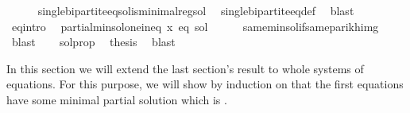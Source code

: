 \begin{isabellebody}
\ \ \ \ \isamarkupfalse%
\ single{\isacharunderscore}{\kern0pt}bipartite{\isacharunderscore}{\kern0pt}eq{\isachardot}{\kern0pt}sol{\isacharunderscore}{\kern0pt}is{\isacharunderscore}{\kern0pt}minimal{\isacharunderscore}{\kern0pt}reg{\isacharunderscore}{\kern0pt}sol\ \isamarkupfalse%
\ single{\isacharunderscore}{\kern0pt}bipartite{\isacharunderscore}{\kern0pt}eq{\isacharunderscore}{\kern0pt}def\ \isamarkupfalse%
\ blast\isanewline
\ \ \isamarkupfalse%
\ eq{\isacharprime}{\kern0pt}{\isacharunderscore}{\kern0pt}intro\ \isamarkupfalse%
\ {\isachardoublequoteopen}partial{\isacharunderscore}{\kern0pt}min{\isacharunderscore}{\kern0pt}sol{\isacharunderscore}{\kern0pt}one{\isacharunderscore}{\kern0pt}ineq\ x\ eq\ {\isacharquery}{\kern0pt}sol{\isachardoublequoteclose}\isanewline
\ \ \ \ \isamarkupfalse%
\ same{\isacharunderscore}{\kern0pt}min{\isacharunderscore}{\kern0pt}sol{\isacharunderscore}{\kern0pt}if{\isacharunderscore}{\kern0pt}same{\isacharunderscore}{\kern0pt}parikh{\isacharunderscore}{\kern0pt}img\ \isamarkupfalse%
\ blast\isanewline
\ \ \isamarkupfalse%
\ sol{\isacharunderscore}{\kern0pt}prop\ \isamarkupfalse%
\ {\isacharquery}{\kern0pt}thesis\ \isamarkupfalse%
\ blast\isanewline
{}\isamarkupfalse%
%
\endisatagproof
{\isafoldproof}%
%
\isadelimproof
%
\endisadelimproof
%
\isadelimdocument
%
\endisadelimdocument
%
\isatagdocument
%
\isamarkuptrue%
%
\endisatagdocument
{\isafolddocument}%
%
\isadelimdocument
%
\endisadelimdocument
%
\begin{isamarkuptext}%
In this section we will extend the last section's result to whole systems of 
equations. For this purpose, we will show by induction on  that the first  equations have
some minimal partial solution which is .


\end{isamarkuptext}
\end{isabellebody}
